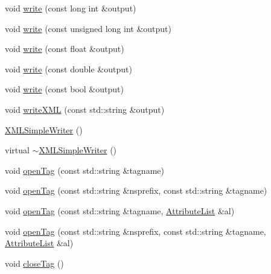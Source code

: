 \begin{DoxyCompactItemize}
\item 
void \mbox{\hyperlink{classXMLWriterAPI_1_1XMLSimpleWriter_a73b030baaf35f5bcb6983de4a133aaf2}{write}} (const long int \&output)
\item 
void \mbox{\hyperlink{classXMLWriterAPI_1_1XMLSimpleWriter_ab905de2de9ab01d4f9d7ae2a5489b19b}{write}} (const unsigned long int \&output)
\item 
void \mbox{\hyperlink{classXMLWriterAPI_1_1XMLSimpleWriter_a0535163fab1b55474edc3e31a52b0c61}{write}} (const float \&output)
\item 
void \mbox{\hyperlink{classXMLWriterAPI_1_1XMLSimpleWriter_a0dc9bdc6334665f7197afbae1139311d}{write}} (const double \&output)
\item 
void \mbox{\hyperlink{classXMLWriterAPI_1_1XMLSimpleWriter_a34886bbfabe67974b8789b070ac27234}{write}} (const bool \&output)
\item 
void \mbox{\hyperlink{classXMLWriterAPI_1_1XMLSimpleWriter_a83601254ff259af02e51d627b4fd4b1b}{write\+X\+ML}} (const std\+::string \&output)
\item 
\mbox{\hyperlink{classXMLWriterAPI_1_1XMLSimpleWriter_aa22ad5550ae58f1a9dc9056c4d342d8b}{X\+M\+L\+Simple\+Writer}} ()
\item 
virtual \mbox{\hyperlink{classXMLWriterAPI_1_1XMLSimpleWriter_aa4dd6f9d05c34b7a0d27d1e7e4773f4c}{$\sim$\+X\+M\+L\+Simple\+Writer}} ()
\item 
void \mbox{\hyperlink{classXMLWriterAPI_1_1XMLSimpleWriter_aaddd3b55ffc11672fef8ce464f2882c4}{open\+Tag}} (const std\+::string \&tagname)
\item 
void \mbox{\hyperlink{classXMLWriterAPI_1_1XMLSimpleWriter_aabef4c9b78d0f9528a0fa0989df1e22e}{open\+Tag}} (const std\+::string \&nsprefix, const std\+::string \&tagname)
\item 
void \mbox{\hyperlink{classXMLWriterAPI_1_1XMLSimpleWriter_a0cd766e4b96a8c67580c8b304faced84}{open\+Tag}} (const std\+::string \&tagname, \mbox{\hyperlink{namespaceXMLWriterAPI_a28cf3d8051a4ccf0aef208b7ebc66d07}{Attribute\+List}} \&al)
\item 
void \mbox{\hyperlink{classXMLWriterAPI_1_1XMLSimpleWriter_a4c32b9b8afe37e1ea1b0723d5248f140}{open\+Tag}} (const std\+::string \&nsprefix, const std\+::string \&tagname, \mbox{\hyperlink{namespaceXMLWriterAPI_a28cf3d8051a4ccf0aef208b7ebc66d07}{Attribute\+List}} \&al)
\item 
void \mbox{\hyperlink{classXMLWriterAPI_1_1XMLSimpleWriter_a29af28d2a197f00ad568f39304ecdbe5}{close\+Tag}} ()
\item 

\end{DoxyCompactItemize}

